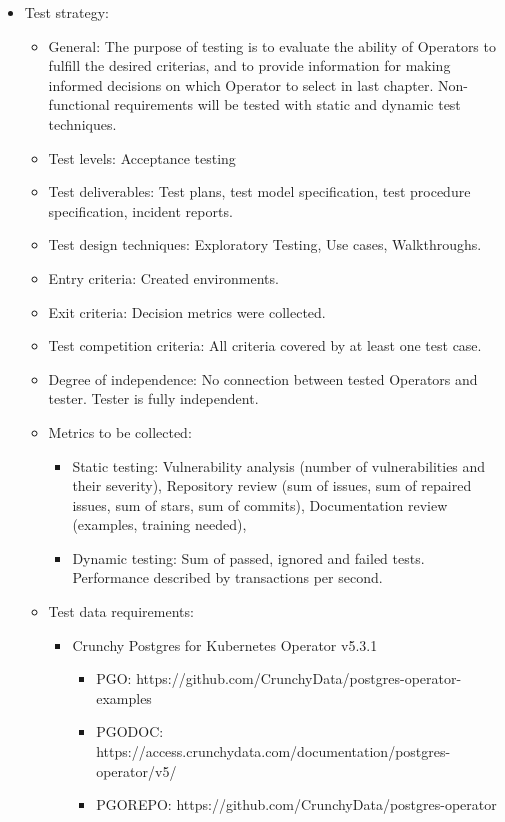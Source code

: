 \begin{itemize}
\begin{itemize}
          \end{itemize}
    \item Test strategy:
          \begin{itemize}
              \item General: The purpose of testing is to evaluate the ability of Operators to fulfill the desired criterias, and to provide information for making informed decisions on which Operator to select in last chapter. Non-functional requirements will be tested with static and dynamic test techniques.
              \item Test levels: Acceptance testing
              \item Test deliverables: Test plans, test model specification, test procedure specification, incident reports.
              \item Test design techniques: Exploratory Testing, Use cases, Walkthroughs.
              \item Entry criteria: Created environments.
              \item Exit criteria: Decision metrics were collected.
              \item Test competition criteria: All criteria covered by at least one test case.
              \item Degree of independence: No connection between tested Operators and tester. Tester is fully independent.
              \item Metrics to be collected:
                    \begin{itemize}
                        \item Static testing: Vulnerability analysis (number of vulnerabilities and their severity), Repository review (sum of issues, sum of repaired issues, sum of stars, sum of commits), Documentation review (examples, training needed),
                        \item Dynamic testing:  Sum of passed, ignored and failed tests. Performance described by transactions per second.
                    \end{itemize}
              \item Test data requirements:
                    \begin{itemize}
                        \item Crunchy Postgres for Kubernetes Operator v5.3.1
                              \begin{itemize}
                                  \item PGO: https://github.com/CrunchyData/postgres-operator-examples
                                  \item PGODOC: https://access.crunchydata.com/documentation/postgres-operator/v5/
                                  \item PGOREPO: https://github.com/CrunchyData/postgres-operator
                              \end{itemize}


\end{itemize}
\end{itemize}
\end{itemize}
